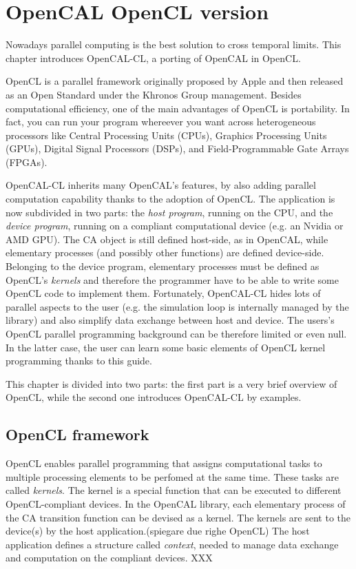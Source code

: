 \chapter{OpenCAL OpenCL version}\label{ch:opencal-cl}


Nowadays parallel computing is the best solution to cross temporal limits. This chapter introduces OpenCAL-CL, a porting of OpenCAL in OpenCL.

OpenCL is a parallel framework originally proposed by Apple and then released as an Open Standard under the Khronos Group management. Besides computational efficiency, one of the main advantages of OpenCL is portability. In fact, you can run your program whereever you want across heterogeneous processors like Central Processing Units (CPUs), Graphics Processing Units (GPUs), Digital Signal Processors (DSPs), and Field-Programmable Gate Arrays (FPGAs).

OpenCAL-CL inherits many OpenCAL's features, by also adding parallel computation capability thanks to the adoption of OpenCL. The application is now subdivided in two parts: the \emph{host program}, running on the CPU, and the \emph{device program}, running on a compliant computational device (e.g. an Nvidia or AMD GPU). The CA object is still defined host-side, as in OpenCAL, while elementary processes (and possibly other functions) are defined device-side. Belonging to the device program, elementary processes must be defined as OpenCL's \emph{kernels} and therefore the programmer have to be able to write some OpenCL code to implement them. Fortunately, OpenCAL-CL hides lots of parallel aspects to the user (e.g. the simulation loop is internally managed by the library) and also simplify data exchange between host and device. The users's OpenCL parallel programming background can be therefore limited or even null. In the latter case, the user can learn some basic elements of OpenCL
kernel programming thanks to this guide.

This chapter is divided into two parts: the first part is a very brief overview of OpenCL, while the second one introduces OpenCAL-CL by examples.

\section{OpenCL framework}
OpenCL enables parallel programming that assigns computational tasks to multiple processing elements to be perfomed at the same time. These tasks are called \emph{kernels}. The kernel is a special function that can be executed to different OpenCL-compliant devices. In the OpenCAL library, each elementary process of the CA transition function can be devised as a kernel.
The kernels are sent to the device(s) by the host application.(spiegare due righe OpenCL) The host application defines a structure called \emph{context}, needed to manage data exchange and computation on the compliant devices. XXX


